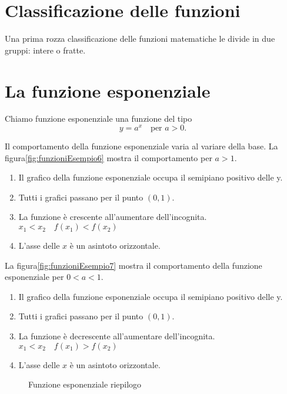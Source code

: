 \section{Classificazione delle funzioni}
Una prima rozza classificazione delle funzioni matematiche le divide in due gruppi: intere o fratte.  
\section{La funzione esponenziale}
\label{sec:LaFunzioneEsponenziale}
\begin{definizione}
	Chiamo funzione esponenziale una funzione del tipo \[y=a^x\quad
	\text{per $a>0$.} \]
\end{definizione}
Il comportamento della funzione esponenziale varia al variare della base. La figura\nobs\vref{fig:funzioniEsempio6} mostra il comportamento per $a>1$.
\begin{enumerate}
\item Il grafico della funzione esponenziale occupa il semipiano positivo delle y.
\item Tutti i grafici passano per il punto $(0,1)$.
\item La funzione è crescente all'aumentare dell'incognita. $x_1<x_2\quad f(x_1)<f(x_2)$ 
\item L'asse delle $x$ è un asintoto orizzontale.
\end{enumerate}
 La figura\nobs\vref{fig:funzioniEsempio7} mostra il comportamento della funzione esponenziale per $0<a<1$. 
 \begin{enumerate}
 \item Il grafico della funzione esponenziale occupa il semipiano positivo delle y.
 \item Tutti i grafici passano per il punto $(0,1)$.
 \item La funzione è  decrescente all'aumentare dell'incognita. $x_1<x_2\quad f(x_1)>f(x_2)$ 
 \item L'asse delle $x$ è un asintoto orizzontale.
 \end{enumerate}
\begin{figure}
\centering
\caption{Funzione esponenziale riepilogo}
\label{fig:FunzioneExp}
\end{figure}

